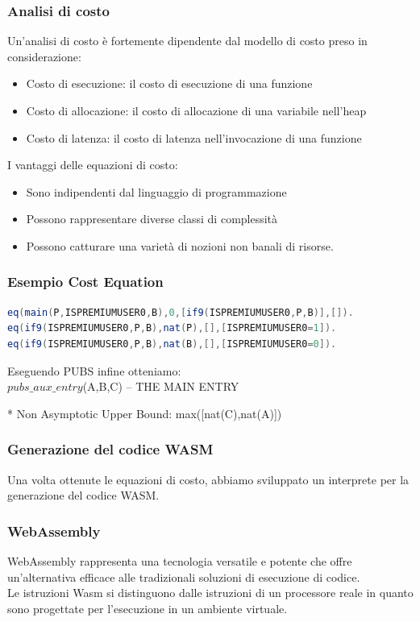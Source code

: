 \documentclass[xcolor=dvipsnames]{beamer}
\begin{document}
\begin{frame}
    \frametitle{Analisi di costo}
    Un'analisi di costo è fortemente dipendente dal modello di costo preso in considerazione:
    \begin{itemize}
        \item \alert{Costo di esecuzione}: il costo di esecuzione di una funzione
        \item \alert{Costo di allocazione}: il costo di allocazione di una variabile nell'heap
        \item \alert{Costo di latenza}: il costo di latenza nell'invocazione di una funzione
    \end{itemize}
    I vantaggi delle equazioni di costo:
    \begin{itemize}
        \item Sono \alert{indipendenti} dal linguaggio di programmazione
        \item Possono rappresentare diverse classi di \alert{complessità}
        \item Possono catturare una varietà di nozioni non banali di risorse.
    \end{itemize}
\end{frame}
\begin{frame}[fragile]
    \frametitle{Esempio Cost Equation}
\begin{lstlisting}[language=Java, caption={Equazioni di costo per Listing 8}]
eq(main(P,ISPREMIUMUSER0,B),0,[if9(ISPREMIUMUSER0,P,B)],[]).
eq(if9(ISPREMIUMUSER0,P,B),nat(P),[],[ISPREMIUMUSER0=1]).
eq(if9(ISPREMIUMUSER0,P,B),nat(B),[],[ISPREMIUMUSER0=0]).
\end{lstlisting}
Eseguendo PUBS infine otteniamo:\\
\bigskip
$pubs\_aux\_entry$(A,B,C) -- THE MAIN ENTRY

  * Non Asymptotic Upper Bound: max([nat(C),nat(A)]) 
\end{frame}
\begin{frame}
    \frametitle{Generazione del codice WASM}
    Una volta ottenute le equazioni di costo, abbiamo sviluppato un interprete per la generazione del codice WASM.\\

\end{frame}
\begin{frame}
    \frametitle{WebAssembly}
    \alert{WebAssembly} rappresenta una tecnologia versatile e potente che offre un'alternativa efficace alle tradizionali soluzioni di esecuzione di codice.\\
    Le istruzioni \alert{Wasm} si distinguono dalle istruzioni di un processore reale in quanto sono progettate per l'esecuzione in un ambiente virtuale.

\end{frame}
\end{document}
